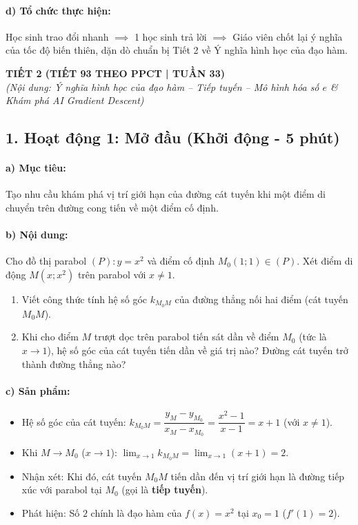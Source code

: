 \documentclass[12pt, a4paper]{article}
\begin{document}
\paragraph{d) Tổ chức thực hiện:} Học sinh trao đổi nhanh $\implies$ 1 học sinh trả lời $\implies$ Giáo viên chốt lại ý nghĩa của tốc độ biến thiên, dặn dò chuẩn bị Tiết 2 về Ý nghĩa hình học của đạo hàm.

\newpage

\begin{center}
    \textbf{\large TIẾT 2 (TIẾT 93 THEO PPCT | TUẦN 33)}\\[4pt]
    \textit{(Nội dung: Ý nghĩa hình học của đạo hàm -- Tiếp tuyến -- Mô hình hóa số $e$ \& Khám phá AI Gradient Descent)}
\end{center}

\subsection*{1. Hoạt động 1: Mở đầu (Khởi động - 5 phút)}

\paragraph{a) Mục tiêu:} Tạo nhu cầu khám phá vị trí giới hạn của đường cát tuyến khi một điểm di chuyển trên đường cong tiến về một điểm cố định.

\paragraph{b) Nội dung:} Cho đồ thị parabol $(P): y = x^2$ và điểm cố định $M_0(1; 1) \in (P)$. Xét điểm di động $M(x; x^2)$ trên parabol với $x \neq 1$.
\begin{enumerate}[leftmargin=0.6cm]
    \item Viết công thức tính hệ số góc $k_{M_0M}$ của đường thẳng nối hai điểm (cát tuyến $M_0M$).
    \item Khi cho điểm $M$ trượt dọc trên parabol tiến sát dần về điểm $M_0$ (tức là $x \to 1$), hệ số góc của cát tuyến tiến dần về giá trị nào? Đường cát tuyến trở thành đường thẳng nào?
\end{enumerate}

\paragraph{c) Sản phẩm:}
\begin{itemize}[leftmargin=0.8cm]
    \item Hệ số góc của cát tuyến: $k_{M_0M} = \dfrac{y_M - y_{M_0}}{x_M - x_{M_0}} = \dfrac{x^2 - 1}{x - 1} = x + 1$ (với $x \neq 1$).
    \item Khi $M \to M_0$ ($x \to 1$): $\lim_{x \to 1} k_{M_0M} = \lim_{x \to 1} (x + 1) = 2$.
    \item Nhận xét: Khi đó, cát tuyến $M_0M$ tiến dần đến vị trí giới hạn là đường tiếp xúc với parabol tại $M_0$ (gọi là \textbf{tiếp tuyến}).
    \item Phát hiện: Số $2$ chính là đạo hàm của $f(x) = x^2$ tại $x_0 = 1$ ($f'(1) = 2$).
\end{itemize}
\end{document}
